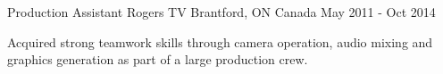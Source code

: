 \begin{cventries}

\cventry
{Production Assistant} %
{Rogers TV} %
{Brantford, ON Canada} %
{May 2011 - Oct 2014} %
{ %
	\begin{cvitems}
		\item {Acquired strong teamwork skills through camera operation, audio 
		mixing and graphics generation as part of a large production crew.}
	\end{cvitems} 
}


\end{cventries}